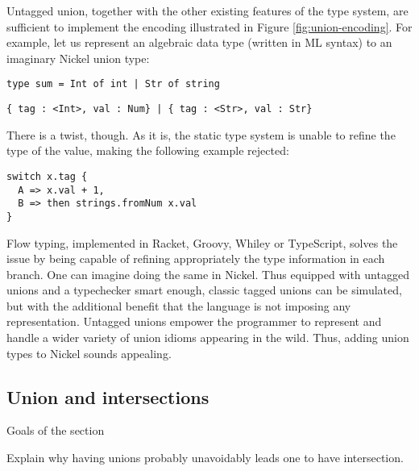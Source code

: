 \documentclass{article}
\begin{document}
Untagged union, together with the other existing features of the type system,
are sufficient to implement the encoding illustrated in Figure
\ref{fig:union-encoding}. For example, let us represent an algebraic data type
(written in ML syntax) to an imaginary Nickel union type:

\begin{lstlisting}
type sum = Int of int | Str of string
\end{lstlisting}

\begin{lstlisting}
{ tag : <Int>, val : Num} | { tag : <Str>, val : Str}
\end{lstlisting}

There is a twist, though. As it is, the static type system is unable to refine
the type of the value, making the following example rejected:

\begin{lstlisting}
switch x.tag {
  A => x.val + 1,
  B => then strings.fromNum x.val
}
\end{lstlisting}

Flow typing, implemented in Racket\cite{FlowTypingRacket1, FlowTypingRacket2},
Groovy\cite{FlowTypingGroovy}, Whiley\cite{FlowTypingWhiley} or
TypeScript\cite{FlowTypingTypeScript}, solves the issue by being capable of
refining appropriately the type information in each branch. One can imagine
doing the same in Nickel. Thus equipped with untagged unions and a typechecker
smart enough, classic tagged unions can be simulated, but with the additional
benefit that the language is not imposing any representation. Untagged unions
empower the programmer to represent and handle a wider variety of union idioms
appearing in the wild.  Thus, adding union types to Nickel sounds appealing.

\subsection{Union and intersections}
\color{red}Goals of the section

Explain why having unions probably unavoidably leads one to have intersection.\vspace{0.5cm}\color{black}


\printbibliography
\end{document}
